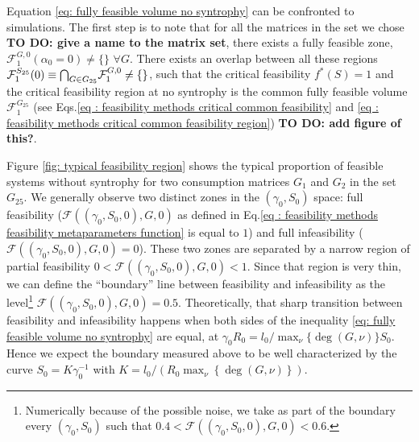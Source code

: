 \documentclass[12pt, titlepage]{report}
\begin{document}
Equation \eqref{eq: fully feasible volume no syntrophy} can be confronted to simulations.
The first step is to note that for all the matrices in the set we chose \textbf{TO DO: give a name to the matrix set}, there exists a fully feasible zone, \ie $\mathcal{F}^{G, 0}_1(\alpha_0=0) \neq \{\}$ $ \forall G$. There exists an overlap between all these regions $\mathcal{F}_1^{S_{25}}(0) \equiv {\bigcap}_{G \in G_{25}} \mathcal{F}^{G,0}_1 \neq \{\}$, such that the critical feasibility $f^*(S)=1$ and the critical feasibility region at no syntrophy is the common fully feasible volume $\mathcal{F}_1^{G_{25}}$ (see Eqs.\eqref{eq : feasibility methods critical common feasibility} and \eqref{eq : feasibility methods critical common feasibility region}) \textbf{TO DO: add figure of this?}.

Figure \ref{fig: typical feasibility region} shows the typical proportion of feasible systems without syntrophy %
for two consumption matrices $G_1$ and $G_2$ in the set $G_{25}$.
We generally observe two distinct zones in the $(\gamma_0, S_0)$ space: full feasibility ($\mathcal{F}\left((\gamma_0, S_0, 0), G, 0\right)$ as defined in Eq.\eqref{eq : feasibility methods feasibility metaparameters function} is equal to $1$) and full infeasibility ($\mathcal{F}\left((\gamma_0, S_0, 0), G, 0\right)=0$). These two zones are separated by a narrow region of partial feasibility $0 <\mathcal{F}\left((\gamma_0, S_0, 0), G, 0\right)<1$. Since that region is very thin, we can define  the ``boundary'' line between feasibility and infeasibility as the level\footnote{Numerically because of the possible noise, we take as part of the boundary every $(\gamma_0, S_0)$ such that $0.4 < \mathcal{F}\left((\gamma_0, S_0, 0), G, 0\right)<0.6$.} $\mathcal{F}\left((\gamma_0, S_0, 0), G, 0\right)=0.5$. Theoretically, that sharp transition between feasibility and infeasibility happens when both sides of the inequality \eqref{eq: fully feasible volume no syntrophy} are equal, \ie at $\gamma_0 R_0 = l_0/\max_\nu\{\deg(G,\nu)\}S_0$. Hence we expect the boundary measured above to be well characterized by the curve $S_0 = K \gamma_0^{-1}$ with $K=l_0/(R_0 \max_\nu\left\{\deg(G,\nu)\right\})$.
\end{document}
